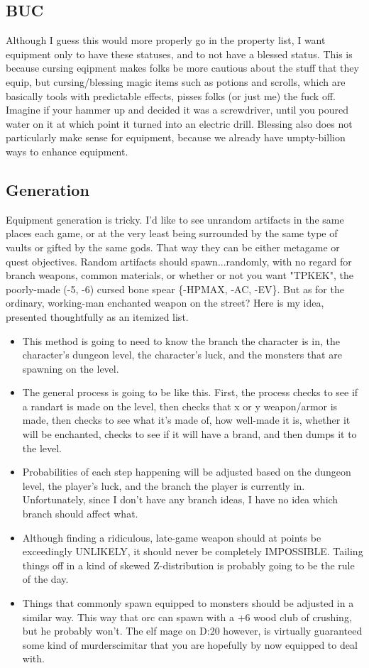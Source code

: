 \documentclass[a4paper,11pt]{article}
\begin{document}
\subsection{BUC}
Although I guess this would more properly go in the property list, I want equipment only to have these statuses, and to not have a blessed status. This is because cursing eqipment makes folks be more cautious about the stuff that they equip, but cursing/blessing magic items such as potions and scrolls, which are basically tools with predictable effects, pisses folks (or just me) the fuck off. Imagine if your hammer up and decided it was a screwdriver, until you poured water on it at which point it turned into an electric drill. Blessing also does not particularly make sense for equipment, because we already have umpty-billion ways to enhance equipment. 

\subsection{Generation}
Equipment generation is tricky. I'd like to see unrandom artifacts in the same places each game, or at the very least being surrounded by the same type of vaults or gifted by the same gods. That way they can be either metagame or quest objectives. Random artifacts should spawn...randomly, with no regard for branch weapons, common materials, or whether or not you want "TPKEK", the poorly-made (-5, -6) cursed bone spear \{-HPMAX, -AC, -EV\}. But as for the ordinary, working-man enchanted weapon on the street? Here is my idea, presented thoughtfully as an itemized list.

\begin{itemize}
 \item This method is going to need to know the branch the character is in, the character's dungeon level, the character's luck, and the monsters that are spawning on the level.
  \item The general process is going to be like this. First, the process checks to see if a randart is made on the level, then checks that x or y weapon/armor is made, then checks to see what it's made of, how well-made it is, whether it will be enchanted, checks to see if it will have a brand, and then dumps it to the level.
  \item Probabilities of each step happening will be adjusted based on the dungeon level, the player's luck, and the branch the player is currently in. Unfortunately, since I don't have any branch ideas, I have no idea which branch should affect what.
  \item Although finding a ridiculous, late-game weapon should at points be exceedingly UNLIKELY, it should never be completely IMPOSSIBLE. Tailing things off in a kind of skewed Z-distribution is probably going to be the rule of the day.
  \item Things that commonly spawn equipped to monsters should be adjusted in a similar way. This way that orc can spawn with a +6 wood club of crushing, but he probably won't. The elf mage on D:20 however, is virtually guaranteed some kind of murderscimitar that you are hopefully by now equipped to deal with.
\end{itemize}
\end{document}
